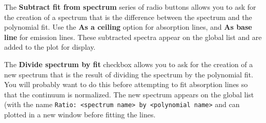 \documentclass[twoside,11pt,nolof]{starlink}
\newcommand{\labelitem}[1]{\textbf{#1}}
\providecommand{\hitext}[1]{\texttt{#1}}
\begin{document}
The \labelitem{Subtract fit from spectrum} series of radio buttons
allows you to ask for the creation of a spectrum that is the difference
between the spectrum and the polynomial fit. Use the \labelitem{As a
ceiling} option for absorption lines, and \labelitem{As base line} for
emission lines. These subtracted spectra appear on the global list and
are added to the plot for display.

The \labelitem{Divide spectrum by fit} checkbox allows you to ask for
the creation of a new spectrum that is the result of dividing the
spectrum by the polynomial fit. You will probably want to do this
before attempting to fit absorption lines so that the continuum is
normalized. The new spectrum appears on the global list (with the
name \hitext{Ratio: <spectrum name> by <polynomial name>} and can
plotted in a new window before fitting the lines.
\end{document}
